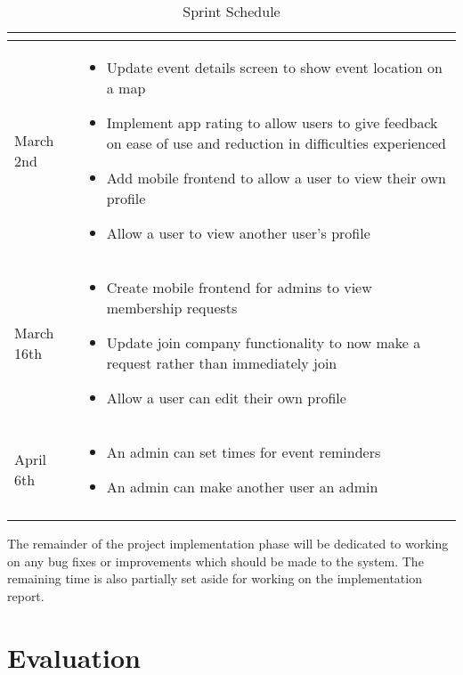 \begin{longtable}{ |p{4cm}|p{10cm}|  }
\begin{itemize}
		\end{itemize}\\
		\hline
		March 2nd & 
		\begin{itemize}
		    \item Update event details screen to show event location on a map
		    \item Implement app rating to allow users to give feedback on ease of use and reduction in difficulties experienced
		    \item Add mobile frontend to allow a user to view their own profile
		    \item Allow a user to view another user's profile
		\end{itemize}\\
		\hline
		March 16th &
		\begin{itemize}
		    \item Create mobile frontend for admins to view membership requests
		    \item Update join company functionality to now make a request rather than immediately join
		    \item Allow a user can edit their own profile
		\end{itemize}\\
		\hline
		April 6th &
		\begin{itemize}
		    \item An admin can set times for event reminders
		    \item An admin can make another user an admin
		\end{itemize}\\
		\hline
    \caption{Sprint Schedule}
	\label{table:sprints}
\end{longtable}

The remainder of the project implementation phase will be dedicated to working on any bug fixes or improvements which should be made to the system. The remaining time is also partially set aside for working on the implementation report.

\section{Evaluation}
\label{section:evaluation}


